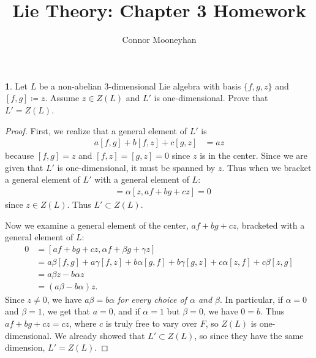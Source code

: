 \documentclass[12pt]{article}
\title{Lie Theory: Chapter 3 Homework}
\author{Connor Mooneyhan}
\date{}
\theoremstyle{definition}
\newtheorem{ex}{}
\begin{document}
\maketitle

\begin{ex}
	Let $L$ be a non-abelian 3-dimensional Lie algebra with basis $\lbrace f, g, z \rbrace$ and $[f, g] \coloneq z$.
	Assume $z \in Z(L)$ and $L'$ is one-dimensional.
	Prove that $L'=Z(L)$.
\end{ex}
\begin{proof}
	First, we realize that a general element of $L'$ is \begin{align*}
		a[f, g] + b[f, z] + c[g, z] & = az
	\end{align*}
	because $[f, g] = z$ and $[f, z] = [g, z] = 0$ since $z$ is in the center.
	Since we are given that $L'$ is one-dimensional, it must be spanned by $z$.
	Thus when we bracket a general element of $L'$ with a general element of $L$: \begin{align*}
		[ \alpha z, a f + b g + c z ] & = \alpha [ z, a f + b g + c z ] = 0
	\end{align*}
	since $z \in Z(L)$.
	Thus $L' \subset Z(L)$.

	Now we examine a general element of the center, $af + bg + cz$, bracketed with a general element of $L$: \begin{align*}
		0 & = [af + bg + cz, \alpha f + \beta g + \gamma z]                                               \\
		  & = a\beta[f, g] + a\gamma[f, z] + b\alpha[g, f] + b\gamma[g, z] + c\alpha[z, f] + c\beta[z, g] \\
		  & = a\beta z - b\alpha z                                                                        \\
		  & = (a\beta - b\alpha)z.
	\end{align*}
	Since $z \neq 0$, we have $a\beta = b\alpha$ \textit{for every choice of $\alpha$ and $\beta$}.
	In particular, if $\alpha = 0$ and $\beta = 1$, we get that $a = 0$, and if $\alpha = 1$ but $\beta = 0$, we have $0 = b$.
	Thus $af + bg + cz = cz$, where $c$ is truly free to vary over $F$, so $Z(L)$ is one-dimensional.
	We already showed that $L' \subset Z(L)$, so since they have the same dimension, $L' = Z(L)$.
\end{proof}
\end{document}
